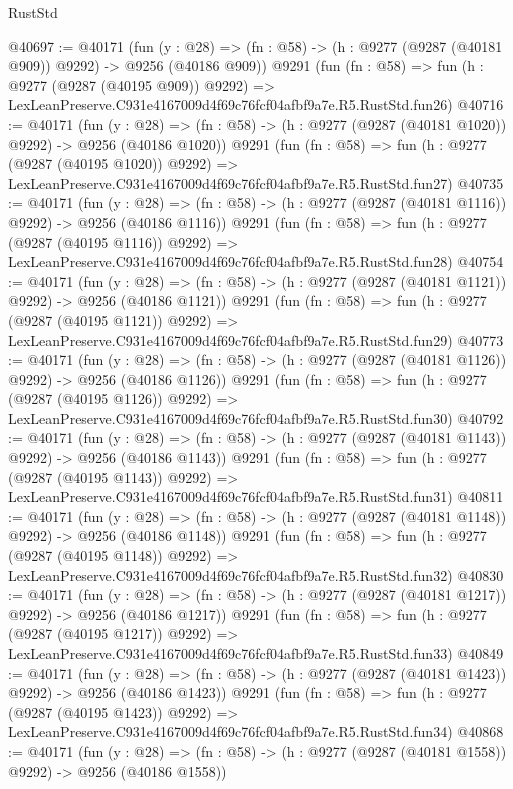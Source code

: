 \begin{lexlean}{RustStd}
\begin{coremodule}
@40697 := @40171
    (fun (y : @28) => (fn : @58) -> (h : @9277 (@9287 (@40181 @909)) @9292) -> @9256 (@40186 @909))
    @9291
    (fun (fn : @58) =>
    fun (h : @9277 (@9287 (@40195 @909)) @9292) =>
    LexLeanPreserve.C931e4167009d4f69c76fcf04afbf9a7e.R5.RustStd.fun26)
@40716 := @40171
    (fun (y : @28) =>
    (fn : @58) -> (h : @9277 (@9287 (@40181 @1020)) @9292) -> @9256 (@40186 @1020))
    @9291
    (fun (fn : @58) =>
    fun (h : @9277 (@9287 (@40195 @1020)) @9292) =>
    LexLeanPreserve.C931e4167009d4f69c76fcf04afbf9a7e.R5.RustStd.fun27)
@40735 := @40171
    (fun (y : @28) =>
    (fn : @58) -> (h : @9277 (@9287 (@40181 @1116)) @9292) -> @9256 (@40186 @1116))
    @9291
    (fun (fn : @58) =>
    fun (h : @9277 (@9287 (@40195 @1116)) @9292) =>
    LexLeanPreserve.C931e4167009d4f69c76fcf04afbf9a7e.R5.RustStd.fun28)
@40754 := @40171
    (fun (y : @28) =>
    (fn : @58) -> (h : @9277 (@9287 (@40181 @1121)) @9292) -> @9256 (@40186 @1121))
    @9291
    (fun (fn : @58) =>
    fun (h : @9277 (@9287 (@40195 @1121)) @9292) =>
    LexLeanPreserve.C931e4167009d4f69c76fcf04afbf9a7e.R5.RustStd.fun29)
@40773 := @40171
    (fun (y : @28) =>
    (fn : @58) -> (h : @9277 (@9287 (@40181 @1126)) @9292) -> @9256 (@40186 @1126))
    @9291
    (fun (fn : @58) =>
    fun (h : @9277 (@9287 (@40195 @1126)) @9292) =>
    LexLeanPreserve.C931e4167009d4f69c76fcf04afbf9a7e.R5.RustStd.fun30)
@40792 := @40171
    (fun (y : @28) =>
    (fn : @58) -> (h : @9277 (@9287 (@40181 @1143)) @9292) -> @9256 (@40186 @1143))
    @9291
    (fun (fn : @58) =>
    fun (h : @9277 (@9287 (@40195 @1143)) @9292) =>
    LexLeanPreserve.C931e4167009d4f69c76fcf04afbf9a7e.R5.RustStd.fun31)
@40811 := @40171
    (fun (y : @28) =>
    (fn : @58) -> (h : @9277 (@9287 (@40181 @1148)) @9292) -> @9256 (@40186 @1148))
    @9291
    (fun (fn : @58) =>
    fun (h : @9277 (@9287 (@40195 @1148)) @9292) =>
    LexLeanPreserve.C931e4167009d4f69c76fcf04afbf9a7e.R5.RustStd.fun32)
@40830 := @40171
    (fun (y : @28) =>
    (fn : @58) -> (h : @9277 (@9287 (@40181 @1217)) @9292) -> @9256 (@40186 @1217))
    @9291
    (fun (fn : @58) =>
    fun (h : @9277 (@9287 (@40195 @1217)) @9292) =>
    LexLeanPreserve.C931e4167009d4f69c76fcf04afbf9a7e.R5.RustStd.fun33)
@40849 := @40171
    (fun (y : @28) =>
    (fn : @58) -> (h : @9277 (@9287 (@40181 @1423)) @9292) -> @9256 (@40186 @1423))
    @9291
    (fun (fn : @58) =>
    fun (h : @9277 (@9287 (@40195 @1423)) @9292) =>
    LexLeanPreserve.C931e4167009d4f69c76fcf04afbf9a7e.R5.RustStd.fun34)
@40868 := @40171
    (fun (y : @28) =>
    (fn : @58) -> (h : @9277 (@9287 (@40181 @1558)) @9292) -> @9256 (@40186 @1558))

\end{coremodule}
\end{lexlean}
